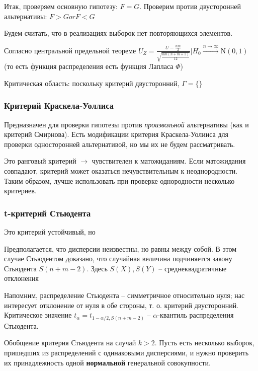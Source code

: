\documentclass[main.tex]{subfiles}
\begin{document}
Итак, проверяем основную гипотезу: $ F = G $.
Проверим против двусторонней альтернативы: $ F > G or F < G $

Будем считать, что в реализациях выборок нет повторяющихся элементов.

Согласно центральной предельной теореме $ U_Z = \frac{U-\frac{nm}{2}}{\sqrt{\frac{nm(n+m+1)}{12}}} | H_0 \xrightarrow{n \to \infty} \mathrm{N}(0,1) $ (то есть функция распределения есть функция Лапласа $ \Phi $)

Критическая область: поскольку критерий двусторонний, $ \mathcal{\Gamma} = \{\} $ %

\subsubsection{Критерий Краскела-Уоллиса}

Предназначен для проверки гипотезы против \emph{произвольной} альтернативы (как и критерий Смирнова).
Есть модификации критерия Краскела-Уолииса для проверки односторонней альтернативой, но мы их не будем рассматривать.

Это ранговый критерий $ \to $ чувствителен к матожиданиям. Если матожидания совпадают, критерий может оказаться нечувствительным к неоднородности.
Таким образом, лучше использовать при проверке однородности несколько критериев. %

\begin{leftbar}
	
\end{leftbar}

\subsubsection{t-критерий Стьюдента}

Это критерий устойчивый, но %

Предполагается, что дисперсии неизвестны, но равны между собой.
В этом случае Стьюдентом доказано, что случайная величина подчиняется закону Стьюдента $ S(n+m-2) $. Здесь $ S(X), S(Y) $ -- среднеквадратичные отклонения

Напомним, распределение Стьюдента -- симметричное относительно нуля; нас интересует отклонение от нуля в обе стороны, т. о. критерий двусторонний.
Критическое значение $ t_\alpha = t_{1 - \alpha/2, S(n+m-2)} $ -- $ \alpha $-квантиль распределения Стьюдента.

Обобщение критерия Стьюдента на случай $ k > 2 $.
Пусть есть несколько выборок, пришедших из распределений с одинаковыми дисперсиями, и нужно проверить их принадлежность одной \textbf{нормальной} генеральной совокупности.
\end{document}
